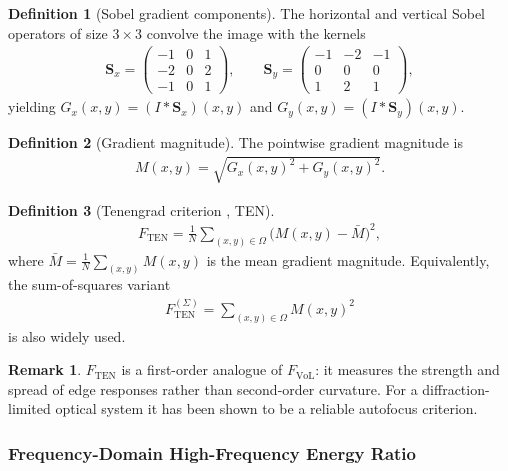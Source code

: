 \documentclass[12pt, xcolor=dvipsnames,svgnames,x11names]{article}
\theoremstyle{definition}
\newtheorem{definition}{Definition}[section]
\newtheorem{remark}{Remark}[section]
\begin{document}
\begin{definition}[Sobel gradient components]
The horizontal and vertical Sobel operators of size $3\times3$ convolve the
image with the kernels
\begin{align*}
  \mathbf{S}_x =
  \begin{pmatrix}
    -1 & 0 & 1 \\
    -2 & 0 & 2 \\
    -1 & 0 & 1
  \end{pmatrix}, \qquad
  \mathbf{S}_y =
  \begin{pmatrix}
    -1 & -2 & -1 \\
     0 &  0 &  0 \\
     1 &  2 &  1
  \end{pmatrix},
\end{align*}
yielding $G_x(x,y) = (I * \mathbf{S}_x)(x,y)$ and
$G_y(x,y) = (I * \mathbf{S}_y)(x,y)$.
\end{definition}

\begin{definition}[Gradient magnitude]
The pointwise gradient magnitude is
\begin{align*}
  M(x,y) = \sqrt{G_x(x,y)^2 + G_y(x,y)^2}.
\end{align*}
\end{definition}

\begin{definition}[Tenengrad criterion ,  TEN]
\begin{align*}
  \boxed{F_{\mathrm{TEN}} =
    \frac{1}{N}\sum_{(x,y)\in\Omega} \bigl(M(x,y) - \bar{M}\bigr)^2,}
\end{align*}
where $\bar{M} = \frac{1}{N}\sum_{(x,y)} M(x,y)$ is the mean gradient magnitude.
Equivalently, the sum-of-squares variant
\begin{align*}
  F_{\mathrm{TEN}}^{(\Sigma)} = \sum_{(x,y)\in\Omega} M(x,y)^2
\end{align*}
is also widely used.
\end{definition}

\begin{remark}
$F_{\mathrm{TEN}}$ is a first-order analogue of $F_{\mathrm{VoL}}$: it measures
the strength and spread of edge responses rather than second-order curvature.
For a diffraction-limited optical system it has been shown to be a reliable
autofocus criterion.
\end{remark}

\subsubsection{Frequency-Domain High-Frequency Energy Ratio}
\end{document}
